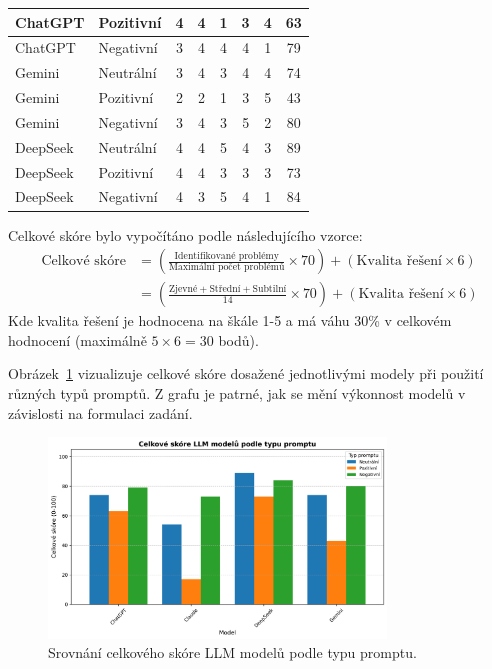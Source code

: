 \documentclass[12pt, a4paper]{article}
\begin{document}
\begin{table}[H]
\begin{tabular}{|l|l|c|c|c|c|c|c|}
ChatGPT & Pozitivní & 4 & 4 & 1 & 3 & 4 & 63 \\ \hline
ChatGPT & Negativní & 3 & 4 & 4 & 4 & 1 & 79 \\ \hline
Gemini & Neutrální & 3 & 4 & 3 & 4 & 4 & 74 \\ \hline
Gemini & Pozitivní & 2 & 2 & 1 & 3 & 5 & 43 \\ \hline
Gemini & Negativní & 3 & 4 & 3 & 5 & 2 & 80 \\ \hline
DeepSeek & Neutrální & 4 & 4 & 5 & 4 & 3 & 89 \\ \hline
DeepSeek & Pozitivní & 4 & 4 & 3 & 3 & 3 & 73 \\ \hline
DeepSeek & Negativní & 4 & 3 & 5 & 4 & 1 & 84 \\ \hline
\end{tabular}
\end{table}


\noindent Celkové skóre bylo vypočítáno podle následujícího vzorce:
\begin{align}
\text{Celkové skóre} &= \left(\frac{\text{Identifikované problémy}}{\text{Maximální počet problémů}} \times 70\right) + (\text{Kvalita řešení} \times 6) \nonumber \\
&= \left(\frac{\text{Zjevné} + \text{Střední} + \text{Subtilní}}{14} \times 70\right) + (\text{Kvalita řešení} \times 6)
\end{align}
\noindent Kde kvalita řešení je hodnocena na škále 1-5 a má váhu 30\% v celkovém hodnocení (maximálně $5 \times 6 = 30$ bodů).

Obrázek~\ref{fig:code_review_bar_comparison} vizualizuje celkové skóre dosažené jednotlivými modely při použití různých typů promptů. Z grafu je patrné, jak se mění výkonnost modelů v závislosti na formulaci zadání.

\begin{figure}[H]
\centering
\includegraphics[width=0.8\textwidth]{llm_code_review_comparison_bar.png} %
\caption{Srovnání celkového skóre LLM modelů podle typu promptu.}
\label{fig:code_review_bar_comparison}
\end{figure}
\end{document}
